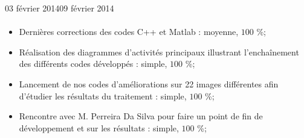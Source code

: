 \documentclass[11pt, french,screen]{report-rd-info}
\begin{document}
\begin{fichesuivi}{03 février 2014}{09 février 2014}
\paragraph{}
	\begin{travaileffectue}
		\begin{itemize}
			\item Dernières corrections des codes C++ et Matlab  : moyenne, $100$ \%;
			\item Réalisation des diagrammes d’activités principaux illustrant l’enchaînement des différents codes développés : simple, $100$ \%;
			\item Lancement de nos codes d’améliorations sur 22 images différentes afin d’étudier les résultats du traitement  : simple, $100$ \%;
			\item Rencontre avec M. Perreira Da Silva pour faire un point de fin de développement et sur les résultats  : simple, $100$ \%;
		\end{itemize}
	\end{travaileffectue}



\end{fichesuivi}
\end{document}

